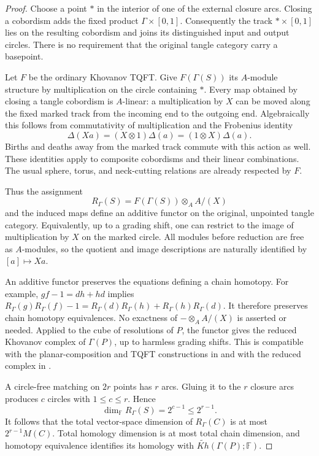 \begin{proof}
Choose a point $*$ in the interior of one of the external closure arcs.
Closing a cobordism adds the fixed product $\Gamma\times[0,1]$.
Consequently the track $*\times[0,1]$ lies on the resulting cobordism
and joins its distinguished input and output circles.  There is no
requirement that the original tangle category carry a basepoint.

Let $F$ be the ordinary Khovanov TQFT.  Give $F(\Gamma(S))$ its
$A$-module structure by multiplication on the circle containing $*$.
Every map obtained by closing a tangle cobordism is $A$-linear: a
multiplication by $X$ can be moved along the fixed marked track from the
incoming end to the outgoing end.  Algebraically this follows from
commutativity of multiplication and the Frobenius identity
\[
 \Delta(Xa)=(X\otimes1)\Delta(a)
             =(1\otimes X)\Delta(a).
\]
Births and deaths away from the marked track commute with this action
as well.  These identities apply to composite cobordisms and their
linear combinations.  The usual sphere, torus, and neck-cutting
relations are already respected by $F$.

Thus the assignment
\[
 R_\Gamma(S)=F(\Gamma(S))\otimes_A A/(X)
\]
and the induced maps define an additive functor on the original,
unpointed tangle category.  Equivalently, up to a grading shift, one
can restrict to the image of multiplication by $X$ on the marked
circle.  All modules before reduction are free as $A$-modules, so
the quotient and image descriptions are naturally identified by
\mbox{$[a]\mapsto Xa$}.

An additive functor preserves the equations defining a chain homotopy.
For example, $gf-1=dh+hd$ implies
$R_\Gamma(g)R_\Gamma(f)-1
=R_\Gamma(d)R_\Gamma(h)+R_\Gamma(h)R_\Gamma(d)$.
It therefore preserves chain homotopy equivalences.  No exactness of
$-\otimes_A A/(X)$ is asserted or needed.  Applied to the cube of
resolutions of $P$, the functor gives the reduced Khovanov complex of
$\Gamma(P)$, up to harmless grading shifts.  This is compatible with
the planar-composition and TQFT constructions in
\cite[Theorem~2 and Section~7]{BarNatanTangles} and with the reduced
complex in \cite[Section~3]{KhovanovPatterns}.

A circle-free matching on $2r$ points has $r$ arcs.  Gluing it to the
$r$ closure arcs produces $c$ circles with $1\le c\le r$.
Hence
\[
 \dim_{\mathbb F}R_\Gamma(S)=2^{c-1}\le2^{r-1}.
\]
It follows that the total vector-space dimension of
$R_\Gamma(C)$ is at most $2^{r-1}M(C)$.  Total homology dimension is
at most total chain dimension, and homotopy equivalence identifies
its homology with $\widetilde{Kh}(\Gamma(P);\mathbb F)$.


\end{proof}

